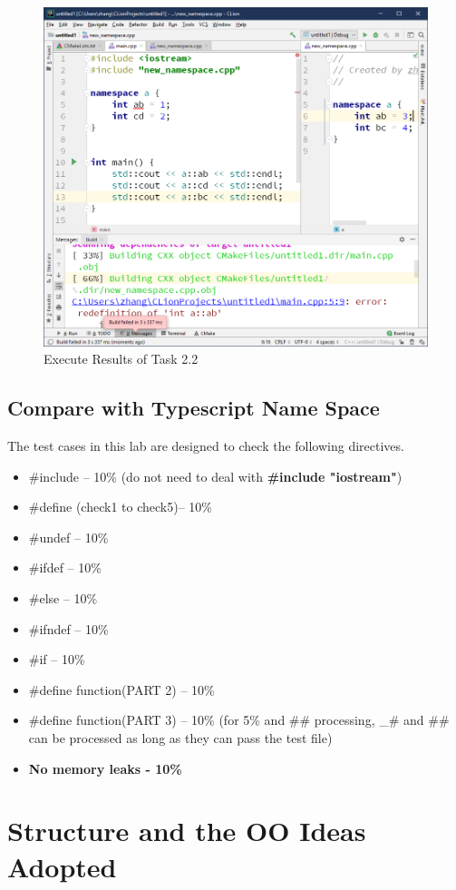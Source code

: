 \documentclass[a4paper]{report}
\begin{document}
\begin{figure}
  \centering
  \includegraphics[scale=0.5]{TwoTwo.PNG}
  \caption{Execute Results of Task 2.2}\label{5}
\end{figure}
\section{Compare with Typescript Name Space}
The test cases in this lab are designed to check the following directives.
\begin{itemize}
\item \#include – 10\% (do not need to deal with \textbf{\#include "iostream"})
\item \#define (check1 to check5)– 10\%
\item \#undef – 10\%
\item \#ifdef – 10\%
\item \#else – 10\%
\item \#ifndef – 10\%
\item \#if – 10\%
\item \#define function(PART 2) – 10\%
\item \#define function(PART 3) – 10\% (for 5\% and \#\# processing, \_\# and \#\# can be processed as long as they can pass the test file)
\item \textbf{No memory leaks - 10\%}
\end{itemize}

\chapter{Structure and  the OO Ideas Adopted}
\end{document}
